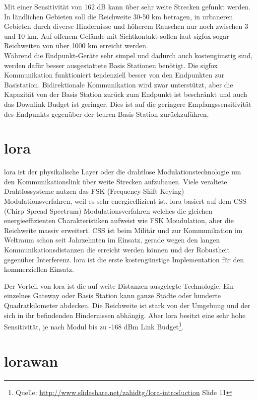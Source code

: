 Mit einer Sensitivität von 162 dB kann über sehr weite Strecken gefunkt werden. In ländlichen Gebieten soll die Reichweite 30-50 km betragen, in urbaneren Gebieten durch diverse Hindernisse und höherem Rauschen nur noch zwischen 3 und 10 km. Auf offenem Gelände mit Sichtkontakt sollen laut \gls{sigfox} sogar Reichweiten von über 1000 km erreicht werden.\\
Während die Endpunkt-Geräte sehr simpel und dadurch auch kostengünstig sind, werden dafür besser ausgestattete Basis Stationen benötigt. Die \gls{sigfox} Kommunikation funktioniert tendenziell besser von den Endpunkten zur Basistation. Bidirektionale Kommunikation wird zwar unterstützt, aber die Kapazität von der Basis Station zurück zum Endpunkt ist beschränkt und auch das Downlink Budget ist geringer. Dies ist auf die geringere Empfangssensitivität des Endpunkts gegenüber der teuren Basis Station zurückzuführen.

\section{\gls{lora}}

\gls{lora} ist der physikalische Layer oder die drahtlose Modulationstechnologie um den Kommunikationslink über weite Strecken aufzubauen. Viele veraltete Drahtlossysteme nutzen das FSK (Frequency-Shift Keying) Modulationsverfahren, weil es sehr energieeffizient ist. \gls{lora} basiert auf dem CSS (Chirp Spread Spectrum) Modulationsverfahren welches die gleichen energieeffizienten Charakteristiken aufweist wie FSK Moudulation, aber die Reichweite massiv erweitert. CSS ist beim Militär und zur Kommunikation im Weltraum schon seit Jahrzehnten im Einsatz, gerade wegen den langen Kommunikationsdistanzen die erreicht werden können und der Robustheit gegenüber Interferenz. \gls{lora} ist die erste kostengünstige Implementation für den kommerziellen Einsatz.    

Der Vorteil von \gls{lora} ist die auf weite Distanzen ausgelegte Technologie. Ein einzelnes Gateway oder Basis Station kann ganze Städte oder hunderte Quadratkilometer abdecken. Die Reichweite ist stark von der Umgebung und der sich in ihr befindenden Hindernissen abhängig. Aber \gls{lora} besitzt eine sehr hohe Sensitivität, je nach Modul bis zu -168 dBm Link Budget\footnote{Quelle: \url{http://www.slideshare.net/zahidtg/lora-introduction} Slide 11}. 

\section{\gls{lorawan}}

